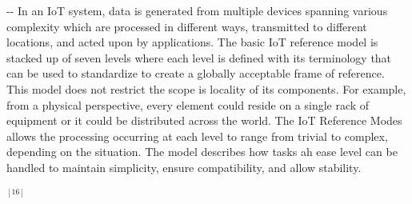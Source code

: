 \documentclass[12pt]{article}
\makeatletter
\newenvironment{indentation}[3]%
	{\par\setlength{\parindent}{#3}
	\setlength{\leftmargin}{#1}       \setlength{\rightmargin}{#2}%
	\advance\linewidth -\leftmargin       \advance\linewidth -\rightmargin%
	\advance\@totalleftmargin\leftmargin  \@setpar{{\@@par}}%
	\parshape 1\@totalleftmargin \linewidth\ignorespaces}{\par}%
\makeatother
\begin{document}
\begin{indentation}{0pt}{0pt}{0pt}
In an IoT system, data is generated from multiple devices spanning various
complexity which are processed in different ways, transmitted to different
locations, and acted upon by applications. The basic IoT reference model is
stacked up of seven levels where each level is defined with its terminology that
can be used to standardize to create a globally acceptable frame of reference.
This model does not restrict the scope is locality of its components. For
example, from a physical perspective, every element could reside on a single rack
of equipment or it could be distributed across the world. The IoT Reference Modes
 allows the processing occurring at each level to range from trivial to
complex, depending on the situation. The model describes how tasks ah ease level
can be handled to maintain simplicity, ensure compatibility, and allow stability.

$^{[16]}$

\end{indentation}
\end{document}
